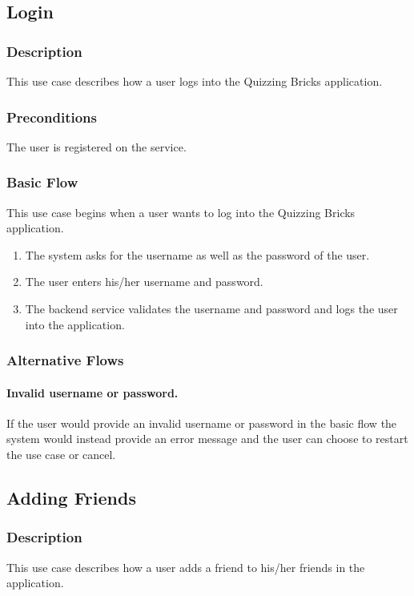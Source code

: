 \subsection{Login}

\subsubsection{Description}
This use case describes how a user logs into the Quizzing Bricks application.

\subsubsection{Preconditions}
The user is registered on the service.

\subsubsection{Basic Flow}
This use case begins when a user wants to log into the Quizzing Bricks application.
\begin{enumerate}
	\item The system asks for the username as well as the password of the user.
	\item The user enters his/her username and password.
	\item The backend service validates the username and password and logs the user into the application.
\end{enumerate}

\subsubsection{Alternative Flows}

\paragraph{Invalid username or password.} 
If the user would provide an invalid username or password in the basic flow the system would instead provide an error message and the user can choose to restart the use case or cancel.


\subsection{Adding Friends}

\subsubsection{Description}
This use case describes how a user adds a friend to his/her friends in the application.

